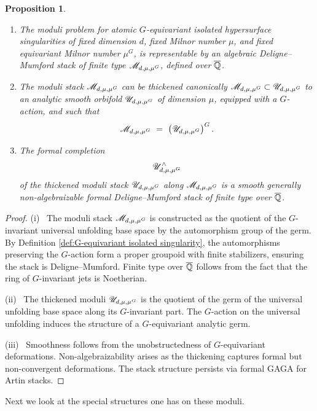 \documentclass[twoside,leqno]{article}
\numberwithin{equation}{section}
\theoremstyle{plain}
\newtheorem{proposition}[equation]{Proposition}
\theoremstyle{definition}
\begin{document}
\begin{proposition}
\begin{enumerate}[wide,label=(\roman*)]
    \item The moduli problem for atomic $G$-equivariant isolated hypersurface singularities of fixed dimension $d$, fixed Milnor number $\mu$, and fixed equivariant Milnor number $\mu^{G}$, is representable by an algebraic Deligne--Mumford stack of finite type 
    $\mathscr{M}_{d,\mu,\mu^{G}}$, defined over $\overline{\mathbb Q}$.
    \item The moduli stack  $\mathscr{M}_{d,\mu,\mu^{G}}$ can be thickened canonically $\mathscr{M}_{d,\mu,\mu^{G}}\subset \mathscr{U}_{d,\mu,\mu^{G}}$ to an analytic smooth orbifold  $\mathscr{U}_{d,\mu,\mu^{G}}$ of dimension $\mu$, equipped with a $G$-action, and such that 
    \[
    \mathscr{M}_{d,\mu,\mu^{G}} \ = \ \left(\mathscr{U}_{d,\mu,\mu^{G}}\right)^{G}.
    \]
    \item The formal completion 
    \[
    \mathscr{U}_{d,\mu,\mu^{G}}^{\wedge}
    \]
    of the thickened moduli stack $\mathscr{U}_{d,\mu,\mu^{G}}$
    along $\mathscr{M}_{d,\mu,\mu^{G}}$ is a smooth generally non-algebraizable formal Deligne--Mumford stack of finite type over $\overline{\mathbb Q}$.
\end{enumerate}
\end{proposition}
\begin{proof}
(i) \ The moduli stack \( \mathscr{M}_{d,\mu,\mu^G} \) is constructed as the quotient of the \( G \)-invariant universal  unfolding base space by the automorphism group of the germ. By Definition \ref{def:G-equivariant isolated singularity}, the automorphisms preserving the \( G \)-action form a proper groupoid with finite stabilizers, ensuring the stack is Deligne--Mumford. Finite type over $\overline{\mathbb Q}$ follows from the fact that the ring of \( G \)-invariant jets is Noetherian.

(ii) \ The thickened moduli $\mathscr{U}_{d,\mu,\mu^G}$ is the quotient of the germ of the universal unfolding base space along its $G$-invariant part. The \( G \)-action on the universal unfolding induces the structure of a \( G \)-equivariant analytic germ. 

(iii) \ Smoothness follows from the unobstructedness of \( G \)-equivariant deformations. Non-algebraiza\-bi\-lity arises as the thickening captures formal but non-convergent deformations. The stack structure persists via formal GAGA for Artin stacks.
\end{proof}

Next we look at the special structures one has on these moduli.
\end{document}

